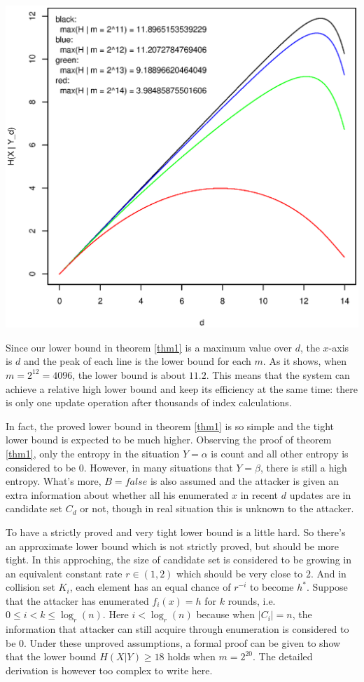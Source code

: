 \documentclass[10pt,a4paper]{article}
\begin{document}
		\begin{center}
		\includegraphics[scale=0.6]{lb_m.eps}
		\end{center}
		
		Since our lower bound in theorem \ref{thm1} is a maximum value
		over $d$, the $x$-axis is $d$ and the peak of each line
		is the lower bound for each $m$. As it shows, when $m = 2^{12} = 4096$, the lower
		bound is about $11.2$. This means that the system can achieve
		a relative high lower bound and keep its efficiency at the same time:
		there is only one update operation after thousands of index calculations.
		
		In fact, the proved lower bound in theorem \ref{thm1} is so
		simple and the tight lower bound is expected to be much higher.
		Observing the proof of theorem \ref{thm1}, only the
		entropy in the situation $Y = \alpha$ is count and
		all other entropy is considered to be $0$. However, in
		many situations that $Y = \beta$, there is still a high entropy.
		What's more, $B = false$ is also assumed and the attacker is
		given an extra information about whether all his enumerated $x$
		in recent $d$ updates are in candidate set $C_d$ or not, though
		in real situation this is unknown to the attacker.
		
		To have a strictly proved and very tight lower bound
		is a little hard.
		So there's an approximate lower bound which is not
		strictly proved, but should be more tight.
		In this approching,
		the size of candidate set is
		considered to be growing in an equivalent
		constant rate $r \in (1, 2)$ which
		should be very close to $2$.
		And in collision set $K_i$, each
		element has an equal chance of
		$r^{-i}$ to become $h^*$.
		Suppose that the attacker
		has enumerated $f_i(x) = h$
		for $k$ rounds, i.e. $0 \leq i < k \leq \log_r(n)$. Here
		$i < \log_r(n)$ because when
		$|C_i| = n$, the information that
		attacker can still acquire through
		enumeration is considered to be $0$.
		Under these unproved assumptions,
		a formal proof can be given to show that the lower bound
		$H(X | Y) \geq 18$ holds when $m = 2^{20}$. 
		The detailed derivation is however too complex
		to write here.
		
\end{document}

